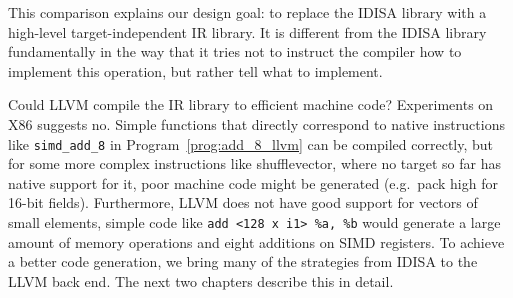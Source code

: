 This comparison explains our design goal: to replace the IDISA library with a high-level target-independent IR library. It is different from the IDISA library fundamentally in the way that it tries not to instruct the compiler how to implement this operation, but rather tell what to implement.

Could LLVM compile the IR library to efficient machine code? Experiments on X86 suggests no. Simple functions that directly correspond to native instructions like {\tt simd\_add\_8} in Program~\ref{prog:add_8_llvm} can be compiled correctly, but for some more complex instructions like shufflevector, where no target so far has native support for it, poor machine code might be generated (e.g.\ pack high for 16-bit fields). Furthermore, LLVM does not have good support for vectors of small elements, simple code like \verb|add <128 x i1> %a, %b| would generate a large amount of memory operations and eight additions on SIMD registers. To achieve a better code generation, we bring many of the strategies from IDISA to the LLVM back end. The next two chapters describe this in detail.

